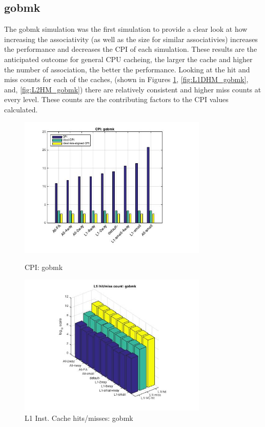\documentclass[11pt,titlepage]{article}
\begin{document}
    \subsection{gobmk}
    The gobmk simulation was the first simulation to provide a clear look at how increasing the associativity (as well as the size for similar associativies) increases the performance and decreases the CPI of each simulation. These results are the anticipated outcome for general CPU cacheing, the larger the cache and higher the number of association, the better the performance. Looking at the hit and miss counts for each of the caches, (shown in Figures \ref{fig:L1IHM_gobmk}, \ref{fig:L1DHM_gobmk}, and, \ref{fig:L2HM_gobmk}) there are relatively consistent and higher miss counts at every level. These counts are the contributing factors to the CPI values calculated. 
    \begin{figure}[H]
          \centering
          \begin{minipage}{.5\textwidth}
            \centering
            \includegraphics[width=9cm]{CPIgobmk}
            \caption{CPI: gobmk}
            \label{fig:CPIgobmk}
          \end{minipage}%
          \begin{minipage}{.5\textwidth}
            \includegraphics[width=9cm]{L1IHM_gobmk}
            \caption{L1 Inst. Cache hits/misses: gobmk}
            \label{fig:L1IHM_gobmk}
          \end{minipage}%
	\end{figure}
\end{document}
